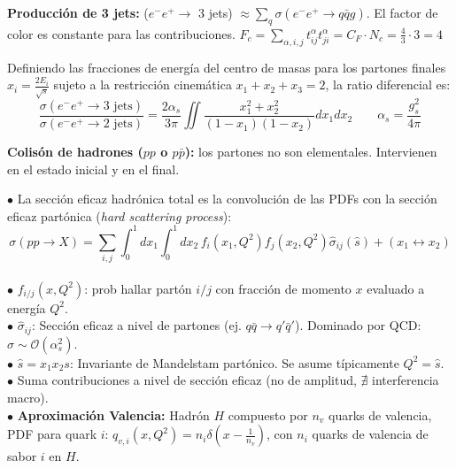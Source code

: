 \textbf{Producción de 3 jets:} ($e^-e^+ \to$ 3 jets) $\approx \sum_q \sigma(e^-e^+ \to q\bar{q}g)$. El factor de color es constante para las contribuciones.
$F_c = \sum_{\alpha, i, j} t_{ij}^\alpha t_{ji}^\alpha = C_F \cdot N_c = \frac{4}{3} \cdot 3 = 4$

Definiendo las fracciones de energía del centro de masas para los partones finales $x_i = \frac{2E_i}{\sqrt{s}}$ sujeto a la restricción cinemática $x_1+x_2+x_3=2$, la ratio diferencial es:
$$\frac{\sigma(e^-e^+ \to 3\text{ jets})}{\sigma(e^-e^+ \to 2\text{ jets})} = \frac{2\alpha_s}{3\pi} \iint \frac{x_1^2+x_2^2}{(1-x_1)(1-x_2)} dx_1 dx_2\qquad \alpha_s = \frac{g_s^2}{4\pi}$$

\textbf{Colisón de hadrones ($pp$ o $p\bar{p}$):}  los partones no son elementales. Intervienen \underline{} en el estado inicial y \underline{} en el final.

$\bullet$ 
La sección eficaz hadrónica total es la convolución de las PDFs con la sección eficaz partónica (\textit{hard scattering process}):
$$\sigma(pp \to X) = \sum_{i,j} \int_0^1 dx_1 \int_0^1 dx_2 \, f_i(x_1, Q^2) f_j(x_2, Q^2) \hat{\sigma}_{ij}(\hat{s}) + (x_1 \leftrightarrow x_2)$$
\\ $\bullet$ $f_{i/j}(x, Q^2)$: prob hallar partón $i/j$ con fracción de momento $x$ evaluado a energía $Q^2$.
\\ $\bullet$ $\hat{\sigma}_{ij}$: Sección eficaz a nivel de partones (ej. $q\bar{q} \to q'\bar{q}'$). Dominado por QCD: $\hat{\sigma} \sim \mathcal{O}(\alpha_s^2)$.
\\ $\bullet$ $\hat{s}= x_1 x_2 s$: Invariante de Mandelstam partónico. Se asume típicamente $Q^2 = \hat{s}$.
\\ $\bullet$ Suma contribuciones a nivel de sección eficaz (no de amplitud, $\nexists$ interferencia macro).\\
$\bullet$ \textbf{Aproximación Valencia:} Hadrón $H$ compuesto por $n_v$ quarks de valencia, PDF para quark $i$: 
$q_{v,i}(x, Q^2) = n_i \delta\left(x - \frac{1}{n_v}\right)$, con $n_i$ quarks de valencia de sabor $i$ en $H$.

